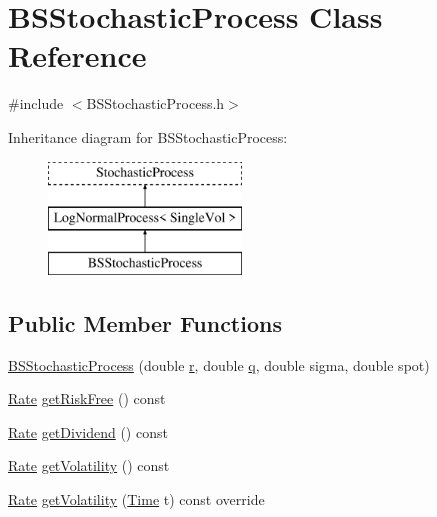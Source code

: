 \hypertarget{class_b_s_stochastic_process}{}\section{B\+S\+Stochastic\+Process Class Reference}
\label{class_b_s_stochastic_process}


{\ttfamily \#include $<$B\+S\+Stochastic\+Process.\+h$>$}

Inheritance diagram for B\+S\+Stochastic\+Process\+:\begin{figure}[H]
\begin{center}
\leavevmode
\includegraphics[height=3.000000cm]{class_b_s_stochastic_process}
\end{center}
\end{figure}
\subsection*{Public Member Functions}
\begin{DoxyCompactItemize}
\item 
\hyperlink{class_b_s_stochastic_process_aed9545004ecc3b8a23e95e6406f48327}{B\+S\+Stochastic\+Process} (double \hyperlink{_uniform_l_ecuyer_r_n_g1_8cpp_a372556d73d7e403d9b677b89b21ee572}{r}, double \hyperlink{_uniform_l_ecuyer_r_n_g1_8cpp_a5cf10165494588b84d4231e0e8a5b1a9}{q}, double sigma, double spot)
\item 
\hyperlink{_name_def_8h_a25bee43a162de339c81f3d1caf6b887d}{Rate} \hyperlink{class_b_s_stochastic_process_a9cd46cb3dceb0aee302bf3a6c2ea39a1}{get\+Risk\+Free} () const
\item 
\hyperlink{_name_def_8h_a25bee43a162de339c81f3d1caf6b887d}{Rate} \hyperlink{class_b_s_stochastic_process_a42caffac3e61f92af6849b86df0d9b6b}{get\+Dividend} () const
\item 
\hyperlink{_name_def_8h_a25bee43a162de339c81f3d1caf6b887d}{Rate} \hyperlink{class_b_s_stochastic_process_ab63f363e94441ed0ee22ef10beea16a6}{get\+Volatility} () const
\item 
\hyperlink{_name_def_8h_a25bee43a162de339c81f3d1caf6b887d}{Rate} \hyperlink{class_b_s_stochastic_process_ad20afb9e82ee123452a7d828837289f6}{get\+Volatility} (\hyperlink{_name_def_8h_ac2d3e0ba793497bcca555c7c2cf64ff3}{Time} t) const override
\end{DoxyCompactItemize}
